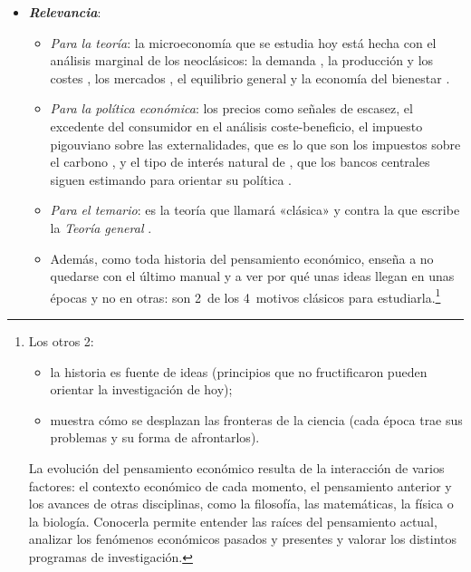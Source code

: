 \documentclass[11pt]{article}
\begin{document}
\begin{itemize}
\item \textbf{\emph{Relevancia}}:
  \begin{itemize}
  \item \emph{Para la teoría}: la microeconomía que se estudia hoy está hecha con el análisis marginal de los neoclásicos: la demanda , la producción y los costes , los mercados , el equilibrio general  y la economía del bienestar .
  \item \emph{Para la política económica}: los precios como señales de escasez, el excedente del consumidor en el análisis coste-beneficio, el impuesto pigouviano sobre las externalidades, que es lo que son los impuestos sobre el carbono , y el tipo de interés natural de , que los bancos centrales siguen estimando para orientar su política\nocite{HolstonLaubachWilliams2017Measuring}  .
  \item \emph{Para el temario}: es la teoría que  llamará «clásica» y contra la que escribe la \emph{Teoría general} .
  \item Además, como toda historia del pensamiento económico, enseña a no quedarse con el último manual y a ver por qué unas ideas llegan en unas épocas y no en otras: son 2~de los 4~motivos clásicos para estudiarla\nocite{Schumpeter1954History}.\footnote{Los otros 2:
\begin{itemize}
\item la historia es fuente de ideas (principios que no fructificaron pueden orientar la investigación de hoy);
\item muestra cómo se desplazan las fronteras de la ciencia (cada época trae sus problemas y su forma de afrontarlos).
\end{itemize}
La evolución del pensamiento económico resulta de la interacción de varios factores: el contexto económico de cada momento, el pensamiento anterior y los avances de otras disciplinas, como la filosofía, las matemáticas, la física o la biología. Conocerla permite entender las raíces del pensamiento actual, analizar los fenómenos económicos pasados y presentes y valorar los distintos programas de investigación.}
  \end{itemize}


\end{itemize}
\end{document}
